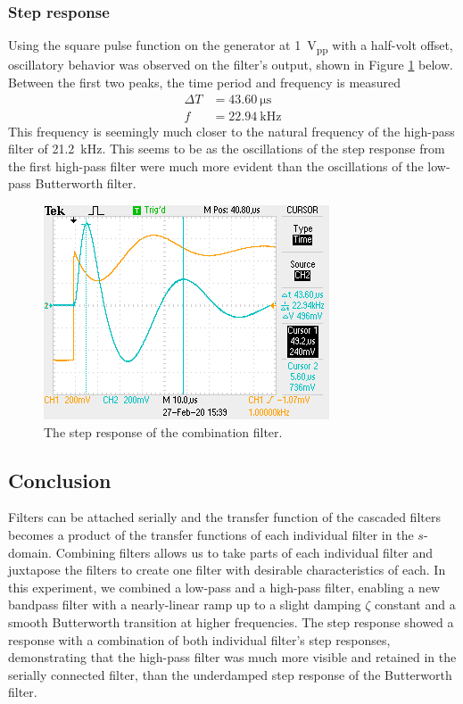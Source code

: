 \documentclass{report}
\newcommand{\pp}{_{pp}}
\newcommand{\Vpp}{\V\pp}
\begin{document}
\subsubsection{Step response}
Using the square pulse function on the generator at \SI{1}{\Vpp} with a half-volt offset, oscillatory behavior was observed on the filter's output, shown in Figure \ref{fig:f0006tek} below. Between the first two peaks, the time period and frequency is measured \begin{align*}
	\Delta T & = \SI{43.60}{\us} \\
	f & = \SI{22.94}{\kHz}
\end{align*}
This frequency is seemingly much closer to the natural frequency of the high-pass filter of \SI{21.2}{\kHz}. This seems to be as the oscillations of the step response from the first high-pass filter were much more evident than the oscillations of the low-pass Butterworth filter. 
\begin{figure}[h]
	\centering
	\includegraphics[width=0.4\linewidth]{"Lab 6 Pics/F0006TEK"}
	\caption{The step response of the combination filter.}
	\label{fig:f0006tek}
\end{figure}

\subsection{Conclusion}
Filters can be attached serially and the transfer function of the cascaded filters becomes a product of the transfer functions of each individual filter in the $s$-domain. Combining filters allows us to take parts of each individual filter and juxtapose the filters to create one filter with desirable characteristics of each. In this experiment, we combined a low-pass and a high-pass filter, enabling a new bandpass filter with a nearly-linear ramp up to a slight damping $\zeta$ constant and a smooth Butterworth transition at higher frequencies. The step response showed a response with a combination of both individual filter's step responses, demonstrating that the high-pass filter was much more visible and retained in the serially connected filter, than the underdamped step response of the Butterworth filter.
\end{document}
